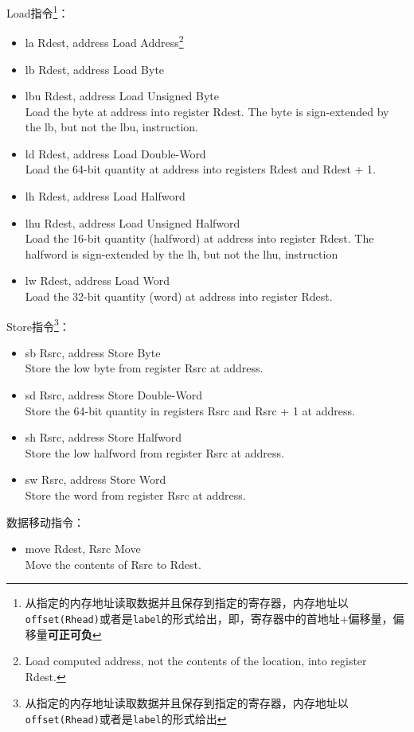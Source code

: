\documentclass[a4paper, 11pt]{article}
\begin{document}
	Load指令\footnote{从指定的内存地址读取数据并且保存到指定的寄存器，内存地址以\texttt{offset(Rhead)}或者是\texttt{label}的形式给出，即，寄存器中的首地址+偏移量，偏移量\textbf{可正可负}}：
	\begin{itemize}
		\item la Rdest, address	\hfill Load Address\footnote{Load computed address, not the contents of the location, into register Rdest.}
		\item lb Rdest, address	\hfill Load Byte
		\item lbu Rdest, address	\hfill Load Unsigned Byte \\
			Load the byte at address into register Rdest. The byte is sign-extended by the lb, but not the lbu, instruction.
		\item ld Rdest, address	\hfill Load Double-Word \\
			Load the 64-bit quantity at address into registers Rdest and Rdest + 1.
		\item lh Rdest, address	\hfill Load Halfword
		\item lhu Rdest, address	\hfill Load Unsigned Halfword \\
			Load the 16-bit quantity (halfword) at address into register Rdest. The halfword is sign-extended by the lh, but not the lhu, instruction
		\item lw Rdest, address	\hfill Load Word \\
		Load the 32-bit quantity (word) at address into register Rdest.
	\end{itemize}
	Store指令\footnote{从指定的内存地址读取数据并且保存到指定的寄存器，内存地址以\texttt{offset(Rhead)}或者是\texttt{label}的形式给出}：
	\begin{itemize}
		\item sb Rsrc, address	\hfill Store Byte \\
			Store the low byte from register Rsrc at address.
		\item sd Rsrc, address	\hfill Store Double-Word \\
			Store the 64-bit quantity in registers Rsrc and Rsrc + 1 at address.
		\item sh Rsrc, address	\hfill Store Halfword \\
			Store the low halfword from register Rsrc at address.
		\item sw Rsrc, address	\hfill Store Word \\
			Store the word from register Rsrc at address.
	\end{itemize}
	数据移动指令：
	\begin{itemize}
		\item move Rdest, Rsrc	\hfill Move \\
			Move the contents of Rsrc to Rdest.
	\end{itemize}
\end{document}
